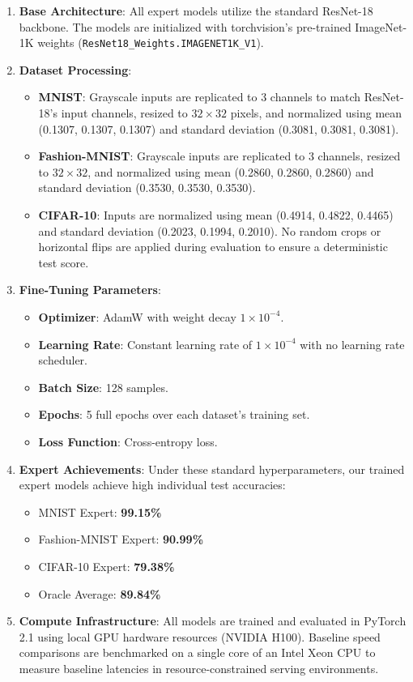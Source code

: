 \documentclass{article}
\begin{document}
\begin{enumerate}
    \item \textbf{Base Architecture}: All expert models utilize the standard ResNet-18 backbone. The models are initialized with torchvision's pre-trained ImageNet-1K weights (\texttt{ResNet18\_Weights.IMAGENET1K\_V1}).
    \item \textbf{Dataset Processing}:
    \begin{itemize}
        \item \textbf{MNIST}: Grayscale inputs are replicated to 3 channels to match ResNet-18's input channels, resized to $32 \times 32$ pixels, and normalized using mean (0.1307, 0.1307, 0.1307) and standard deviation (0.3081, 0.3081, 0.3081).
        \item \textbf{Fashion-MNIST}: Grayscale inputs are replicated to 3 channels, resized to $32 \times 32$, and normalized using mean (0.2860, 0.2860, 0.2860) and standard deviation (0.3530, 0.3530, 0.3530).
        \item \textbf{CIFAR-10}: Inputs are normalized using mean (0.4914, 0.4822, 0.4465) and standard deviation (0.2023, 0.1994, 0.2010). No random crops or horizontal flips are applied during evaluation to ensure a deterministic test score.
    \end{itemize}
    \item \textbf{Fine-Tuning Parameters}:
    \begin{itemize}
        \item \textbf{Optimizer}: AdamW with weight decay $1 \times 10^{-4}$.
        \item \textbf{Learning Rate}: Constant learning rate of $1 \times 10^{-4}$ with no learning rate scheduler.
        \item \textbf{Batch Size}: 128 samples.
        \item \textbf{Epochs}: 5 full epochs over each dataset's training set.
        \item \textbf{Loss Function}: Cross-entropy loss.
    \end{itemize}
    \item \textbf{Expert Achievements}: Under these standard hyperparameters, our trained expert models achieve high individual test accuracies:
    \begin{itemize}
        \item MNIST Expert: \textbf{99.15\%}
        \item Fashion-MNIST Expert: \textbf{90.99\%}
        \item CIFAR-10 Expert: \textbf{79.38\%}
        \item Oracle Average: \textbf{89.84\%}
    \end{itemize}
    \item \textbf{Compute Infrastructure}: All models are trained and evaluated in PyTorch 2.1 using local GPU hardware resources (NVIDIA H100). Baseline speed comparisons are benchmarked on a single core of an Intel Xeon CPU to measure baseline latencies in resource-constrained serving environments.
\end{enumerate}
\end{document}
